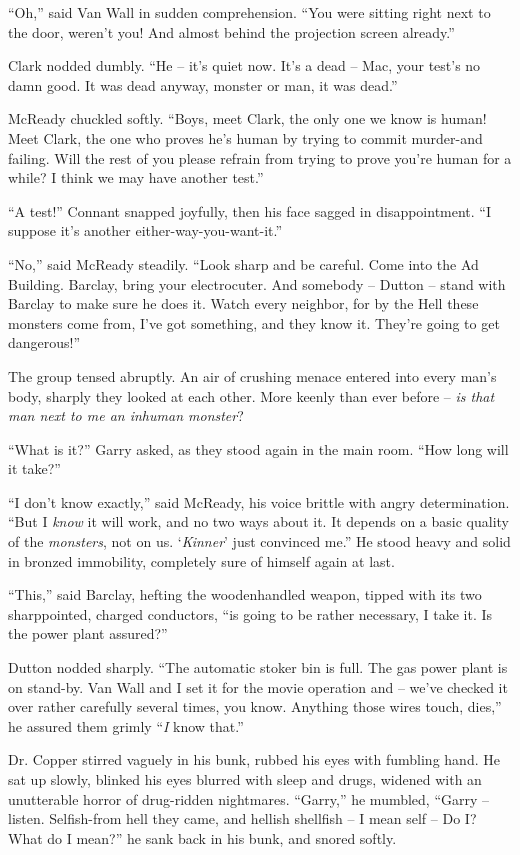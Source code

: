 \documentclass[ebook,oneside,11pt]{memoir}				%
\begin{document}
``Oh,'' said Van Wall in sudden comprehension. ``You were sitting right next to the door, weren't you! And almost behind the projection screen already.''

Clark nodded dumbly. ``He -- it's quiet now. It's a dead -- Mac, your test's no damn good. It was dead anyway, monster or man, it was dead.''

McReady chuckled softly. ``Boys, meet Clark, the only one we know is human! Meet Clark, the one who proves he's human by trying to commit murder-and failing. Will the rest of you please refrain from trying to prove you're human for a while? I think we may have another test.''

``A test!'' Connant snapped joyfully, then his face sagged in disappointment. ``I suppose it's another either-way-you-want-it.''

``No,'' said McReady steadily. ``Look sharp and be careful. Come into the Ad Building. Barclay, bring your electrocuter. And somebody -- Dutton -- stand with Barclay to make sure he does it. Watch every neighbor, for by the Hell these monsters come from, I've got something, and they know it. They're going to get dangerous!''

The group tensed abruptly. An air of crushing menace entered into every man's body, sharply they looked at each other. More keenly than ever before -- \emph{is that man next to me an inhuman monster}?

``What is it?'' Garry asked, as they stood again in the main room. ``How long will it take?''

``I don't know exactly,'' said McReady, his voice brittle with angry determination. ``But I \emph{know} it will work, and no two ways about it. It depends on a basic quality of the \emph{monsters}, not on us. `\emph{Kinner}' just convinced me.'' He stood heavy and solid in bronzed immobility, completely sure of himself again at last.

``This,'' said Barclay, hefting the woodenhandled weapon, tipped with its two sharppointed, charged conductors, ``is going to be rather necessary, I take it. Is the power plant assured?''

Dutton nodded sharply. ``The automatic stoker bin is full. The gas power plant is on stand-by. Van Wall and I set it for the movie operation and -- we've checked it over rather carefully several times, you know. Anything those wires touch, dies,'' he assured them grimly ``\emph{I} know that.''

Dr. Copper stirred vaguely in his bunk, rubbed his eyes with fumbling hand. He sat up slowly, blinked his eyes blurred with sleep and drugs, widened with an unutterable horror of drug-ridden nightmares. ``Garry,'' he mumbled, ``Garry -- listen. Selfish-from hell they came, and hellish shellfish -- I mean self -- Do I? What do I mean?'' he sank back in his bunk, and snored softly.
\end{document}

